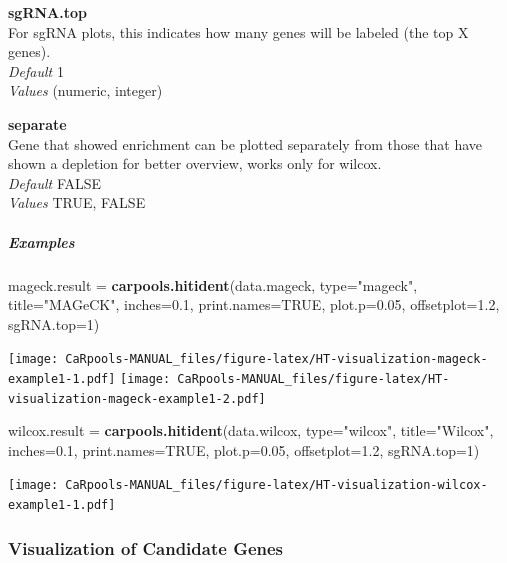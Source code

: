 \documentclass[]{article}
\newenvironment{Shaded}{\begin{snugshade}}{\end{snugshade}}
\newcommand{\KeywordTok}[1]{\textcolor[rgb]{0.13,0.29,0.53}{\textbf{{#1}}}}
\newcommand{\DataTypeTok}[1]{\textcolor[rgb]{0.13,0.29,0.53}{{#1}}}
\newcommand{\DecValTok}[1]{\textcolor[rgb]{0.00,0.00,0.81}{{#1}}}
\newcommand{\FloatTok}[1]{\textcolor[rgb]{0.00,0.00,0.81}{{#1}}}
\newcommand{\StringTok}[1]{\textcolor[rgb]{0.31,0.60,0.02}{{#1}}}
\newcommand{\OtherTok}[1]{\textcolor[rgb]{0.56,0.35,0.01}{{#1}}}
\newcommand{\NormalTok}[1]{{#1}}
\let\oldsubparagraph\subparagraph
\renewcommand{\subparagraph}[1]{\oldsubparagraph{#1}\mbox{}}
\begin{document}
\textbf{sgRNA.top}\\
For sgRNA plots, this indicates how many genes will be labeled (the top
X genes).\\
\emph{Default} 1\\
\emph{Values} (numeric, integer)

\textbf{separate}\\
Gene that showed enrichment can be plotted separately from those that
have shown a depletion for better overview, works only for wilcox.\\
\emph{Default} FALSE\\
\emph{Values} TRUE, FALSE

\subparagraph{Examples}\label{examples}

\begin{Shaded}
\begin{Highlighting}[]
\NormalTok{mageck.result =}\StringTok{ }\KeywordTok{carpools.hitident}\NormalTok{(data.mageck, }\DataTypeTok{type=}\StringTok{"mageck"}\NormalTok{, }\DataTypeTok{title=}\StringTok{"MAGeCK"}\NormalTok{, }\DataTypeTok{inches=}\FloatTok{0.1}\NormalTok{, }\DataTypeTok{print.names=}\OtherTok{TRUE}\NormalTok{, }\DataTypeTok{plot.p=}\FloatTok{0.05}\NormalTok{, }\DataTypeTok{offsetplot=}\FloatTok{1.2}\NormalTok{, }\DataTypeTok{sgRNA.top=}\DecValTok{1}\NormalTok{)}
\end{Highlighting}
\end{Shaded}

\texttt{[image: CaRpools-MANUAL\_files/figure-latex/HT-visualization-mageck-example1-1.pdf]}
\texttt{[image: CaRpools-MANUAL\_files/figure-latex/HT-visualization-mageck-example1-2.pdf]}

\begin{Shaded}
\begin{Highlighting}[]
\NormalTok{wilcox.result =}\StringTok{ }\KeywordTok{carpools.hitident}\NormalTok{(data.wilcox, }\DataTypeTok{type=}\StringTok{"wilcox"}\NormalTok{, }\DataTypeTok{title=}\StringTok{"Wilcox"}\NormalTok{, }\DataTypeTok{inches=}\FloatTok{0.1}\NormalTok{, }\DataTypeTok{print.names=}\OtherTok{TRUE}\NormalTok{, }\DataTypeTok{plot.p=}\FloatTok{0.05}\NormalTok{, }\DataTypeTok{offsetplot=}\FloatTok{1.2}\NormalTok{, }\DataTypeTok{sgRNA.top=}\DecValTok{1}\NormalTok{)}
\end{Highlighting}
\end{Shaded}

\texttt{[image: CaRpools-MANUAL\_files/figure-latex/HT-visualization-wilcox-example1-1.pdf]}

\subsubsection{Visualization of Candidate
Genes}\label{visualization-of-candidate-genes}
\end{document}

